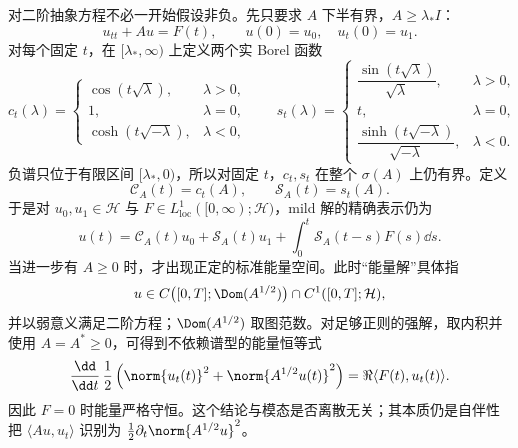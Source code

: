 对二阶抽象方程不必一开始假设非负。先只要求 $A$ 下半有界，$A\ge\lambda_*I$：
\begin{equation*}u_{tt}+Au=F(t),\qquad u(0)=u_0,\quad u_t(0)=u_1.
\end{equation*}
对每个固定 $t$，在 $[\lambda_*,\infty)$ 上定义两个实 Borel 函数
\begin{equation}\label{eq:math-sl-lower-bounded-wave-scalars}
 c_t(\lambda)=
 \begin{cases}
 \cos(t\sqrt\lambda),&\lambda>0,\\
 1,&\lambda=0,\\
 \cosh(t\sqrt{-\lambda}),&\lambda<0,
 \end{cases}
 \qquad
 s_t(\lambda)=
 \begin{cases}
 \dfrac{\sin(t\sqrt\lambda)}{\sqrt\lambda},&\lambda>0,\\[1ex]
 t,&\lambda=0,\\[1ex]
 \dfrac{\sinh(t\sqrt{-\lambda})}{\sqrt{-\lambda}},&\lambda<0.
 \end{cases}
\end{equation}
负谱只位于有限区间 $[\lambda_*,0)$，所以对固定 $t$，$c_t,s_t$ 在整个 $\sigma(A)$ 上仍有界。定义
\[
 \mathcal C_A(t)=c_t(A),\qquad \mathcal S_A(t)=s_t(A).
\]
于是对 $u_0,u_1\in\mathcal H$ 与
$F\in L^1_{\mathrm{loc}}([0,\infty);\mathcal H)$，mild 解的精确表示仍为
\begin{equation}\label{eq:math-sl-wave-cosine-formula}
 u(t)=\mathcal C_A(t)u_0+\mathcal S_A(t)u_1+
 \int_0^t\mathcal S_A(t-s)F(s)\dd s.
\end{equation}
当进一步有 $A\ge0$ 时，才出现正定的标准能量空间。此时“能量解”具体指
\[
 u\in C\bigl([0,T];\Dom(A^{1/2})\bigr)
 \cap C^1([0,T];\mathcal H),
\]
并以弱意义满足二阶方程；$\Dom(A^{1/2})$ 取图范数。对足够正则的强解，取内积并使用 $A=A^*\ge0$，可得到不依赖谱型的能量恒等式
\begin{equation*}\frac{\dd}{\dd t}\,
 \frac12\left(\norm{u_t(t)}^2+\norm{A^{1/2}u(t)}^2\right)
 =\Re\langle F(t),u_t(t)\rangle.
\end{equation*}
因此 $F=0$ 时能量严格守恒。这个结论与模态是否离散无关；其本质仍是自伴性把 $\langle Au,u_t\rangle$ 识别为 $\frac12\partial_t\norm{A^{1/2}u}^2$。

